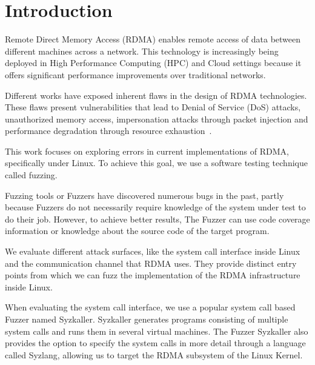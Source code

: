 \section{Introduction}





Remote Direct Memory Access (RDMA) enables remote access of data between different machines across a network\cite{rothenbergerReDMArkBypassingRDMA2021}.
This technology is increasingly being deployed in High Performance Computing (HPC) and Cloud settings because
it offers significant performance improvements over traditional networks.

Different works have exposed inherent flaws in the design of RDMA technologies. These flaws present
vulnerabilities that lead to Denial of Service (DoS) attacks, unauthorized memory access, impersonation
attacks through packet injection and performance degradation through resource
exhaustion~\cite{rothenbergerReDMArkBypassingRDMA2021}\cite{tsaiDoubleEdgedSwordSecurity2019}.

This work focuses on exploring errors in current implementations of RDMA, specifically under Linux.
To achieve this goal, we use a software testing technique called fuzzing.

Fuzzing tools or Fuzzers have discovered numerous bugs in the past, partly because
Fuzzers do not necessarily require knowledge of the system under test to do their job. However, to achieve better results,
The Fuzzer can use code coverage information or knowledge about the source code of the target program.

We evaluate different attack surfaces, like the system call interface inside Linux and the
communication channel that RDMA uses. They provide distinct entry points from which
we can fuzz the implementation of the RDMA infrastructure inside Linux.

When evaluating the system call interface, we use a popular system call based Fuzzer named Syzkaller.
Syzkaller generates programs consisting of multiple system calls and runs them in several virtual machines. The
Fuzzer Syzkaller also provides the option to specify the system calls in more detail through a language called Syzlang,
allowing us to target the RDMA subsystem of the Linux Kernel.

